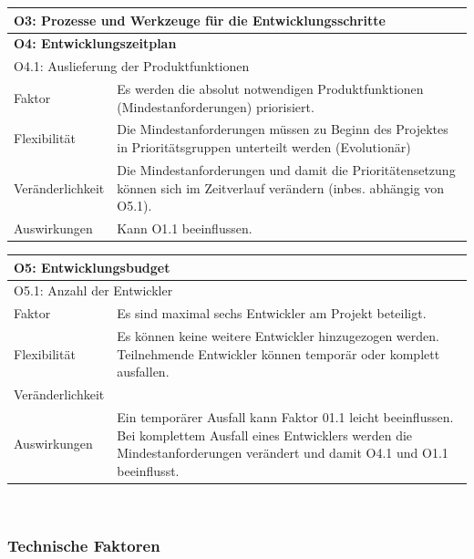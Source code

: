 \documentclass[fontsize=12pt,paper=a4,twoside]{scrartcl}
\begin{document}
\newpage

\begin{tabularx}{\textwidth}{|l|X|}
\hline
\multicolumn{2}{|l|}{\textbf{O3: Prozesse und Werkzeuge für die Entwicklungsschritte}}\\\hline

\multicolumn{2}{|l|}{\textbf{O4: Entwicklungszeitplan}}\\\hline
\multicolumn{2}{|l|}{O4.1: Auslieferung der Produktfunktionen}\\\hline
 Faktor & Es werden die absolut notwendigen Produktfunktionen (Mindestanforderungen) priorisiert. \\\hline
 Flexibilität & Die Mindestanforderungen müssen zu Beginn des Projektes in Prioritätsgruppen unterteilt werden (Evolutionär) \\\hline
 Veränderlichkeit &  Die Mindestanforderungen und damit die Prioritätensetzung können sich im Zeitverlauf verändern (inbes. abhängig von O5.1). \\\hline
 Auswirkungen & Kann O1.1 beeinflussen.\\\hline
\end{tabularx}

\begin{tabularx}{\textwidth}{|l|X|}
\hline
\multicolumn{2}{|l|}{\textbf{O5: Entwicklungsbudget}}\\\hline
\multicolumn{2}{|l|}{O5.1: Anzahl der Entwickler}\\\hline
 Faktor & Es sind maximal sechs Entwickler am Projekt beteiligt. \\\hline
 Flexibilität & Es können keine weitere Entwickler hinzugezogen werden. Teilnehmende Entwickler können temporär oder komplett ausfallen. \\\hline
 Veränderlichkeit & \\\hline
 Auswirkungen & Ein temporärer Ausfall kann Faktor 01.1 leicht beeinflussen. Bei komplettem Ausfall eines Entwicklers werden die Mindestanforderungen verändert und damit O4.1 und O1.1 beeinflusst.\\\hline
\end{tabularx}\\
\clearpage

\subsubsection{Technische Faktoren}
\end{document}
